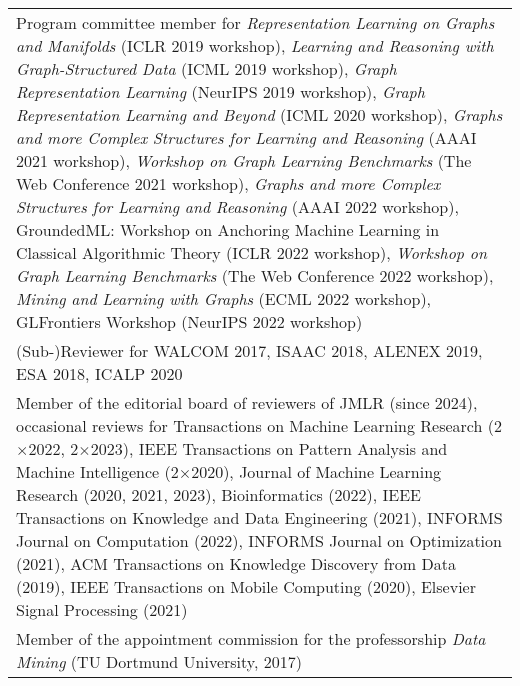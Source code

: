 \documentclass[11pt, a4paper, DIV=14, headings=small]{scrartcl}
\begin{document}
\begin{longtabu}{p{14.5cm}}
		Program committee member for \emph{Representation Learning on Graphs and Manifolds} (ICLR 2019 workshop), \emph{Learning and Reasoning with Graph-Structured Data} (ICML 2019 workshop), \emph{Graph Representation Learning} (NeurIPS 2019 workshop), \emph{Graph Representation Learning and Beyond} (ICML 2020 workshop), \emph{Graphs and more Complex Structures for Learning and Reasoning} (AAAI 2021 workshop), \emph{Workshop on Graph Learning Benchmarks} (The Web Conference 2021 workshop),  \emph{Graphs and more Complex Structures for Learning and Reasoning} (AAAI 2022 workshop), GroundedML: Workshop on Anchoring Machine Learning in Classical Algorithmic Theory (ICLR 2022 workshop), \emph{Workshop on Graph Learning Benchmarks} (The Web Conference 2022 workshop), \emph{Mining and Learning with Graphs} (ECML 2022 workshop), GLFrontiers Workshop (NeurIPS 2022 workshop) \\
		
		
		(Sub-)Reviewer for WALCOM 2017, ISAAC 2018, ALENEX 2019, ESA 2018, ICALP 2020                                                                                                                                                                                                                                                                                                                                                                                                                                                                                                                                                                                                                                                                                                                                                                                                                 \\
		
		Member of the editorial board of reviewers of JMLR (since 2024), occasional reviews for Transactions on Machine Learning Research (2$\times$2022, 2$\times$2023), IEEE Transactions on Pattern Analysis and Machine Intelligence (2$\times$2020), Journal of Machine Learning Research (2020, 2021, 2023), Bioinformatics (2022), IEEE Transactions on Knowledge and Data Engineering (2021), INFORMS Journal on Computation (2022), INFORMS Journal on Optimization (2021), ACM Transactions on Knowledge Discovery from Data (2019), IEEE Transactions on Mobile Computing (2020), Elsevier Signal Processing (2021)                                                                                                                                                                                                                                                                                                                                                                         \\
		
		Member of the appointment commission for the professorship \emph{Data Mining} (TU Dortmund University, 2017)
	\end{longtabu}
	
\end{document}
